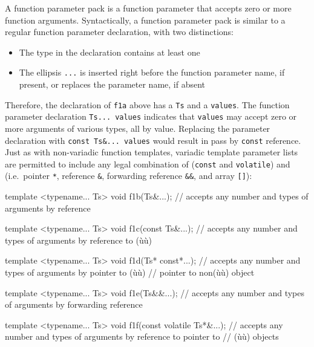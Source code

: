 \noindent A function parameter pack is a function parameter that accepts zero or
more function arguments. Syntactically, a function parameter pack is
similar to a regular function parameter declaration, with two
distinctions:
\begin{itemize}
\item{The type in the declaration contains at least one }
\item{The ellipsis \lstinline!...! is inserted right before the function parameter name, if present, or replaces the parameter name, if absent}
\end{itemize}
Therefore, the declaration of \lstinline!f1a! above has a  \lstinline!Ts! and a 
\lstinline!values!. The function parameter declaration
\lstinline!Ts...!~\lstinline!values! indicates that \lstinline!values! may accept
zero or more arguments of various types, all by value. Replacing the
parameter declaration with
\lstinline!const!~\lstinline!Ts&...!~\lstinline!values! would result in pass by
\lstinline!const! reference. Just as with non-variadic function templates,
variadic template parameter lists are permitted to include any legal
combination of  (\lstinline!const! and
\lstinline!volatile!) and  (i.e.~pointer
\lstinline!*!, reference \lstinline!&!, forwarding reference \lstinline!&&!,
and array \lstinline![]!):

\begin{emcppslisting}
template <typename... Ts> void f1b(Ts&...);
   // accepts any number and types of arguments by reference

template <typename... Ts> void f1c(const Ts&...);
   // accepts any number and types of arguments by reference to (ù{}ù)

template <typename... Ts> void f1d(Ts* const*...);
   // accepts any number and types of arguments by pointer to (ù{}ù)
   // pointer to non(ù{}ù) object

template <typename... Ts> void f1e(Ts&&...);
   // accepts any number and types of arguments by forwarding reference

template <typename... Ts> void f1f(const volatile Ts*&...);
   // accepts any number and types of arguments by reference to pointer to
   // (ù{}ù) objects
\end{emcppslisting}
    

